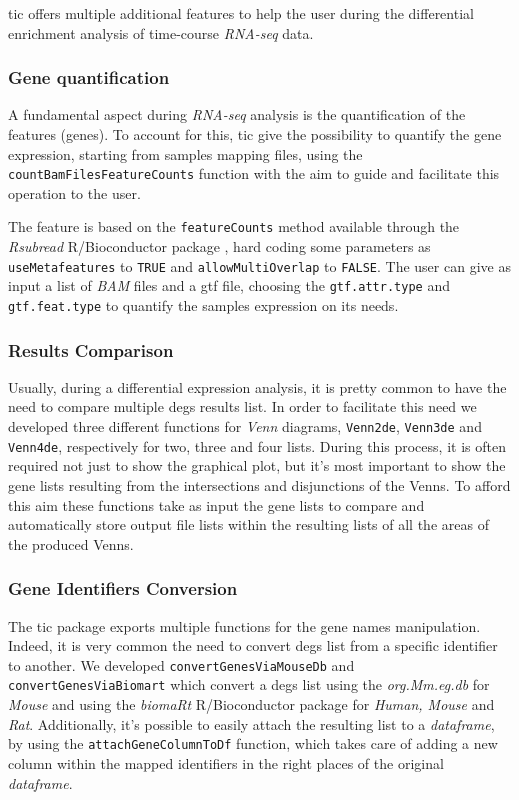 \gls{tic} offers multiple additional features to help the user during the differential enrichment analysis of time-course \textit{RNA-seq} data.

\subsubsection{Gene quantification}

A fundamental aspect during \textit{RNA-seq} analysis is the quantification of the features (genes).
To account for this, \gls{tic} give the possibility to quantify the gene expression, starting from samples mapping files, using the \lstinline!countBamFilesFeatureCounts! function with the aim to guide and facilitate this operation to the user.

The feature is based on the \lstinline!featureCounts! method available through the \textit{Rsubread} R/Bioconductor package \cite{Liao2013}, hard coding some parameters as \lstinline!useMetafeatures! to \lstinline!TRUE! and \lstinline!allowMultiOverlap! to \lstinline!FALSE!.
The user can give as input a list of \textit{BAM} files and a \gls{gtf} file, choosing  the \lstinline!gtf.attr.type! and \lstinline!gtf.feat.type! to quantify the samples expression on its needs.

\subsubsection{Results Comparison}

Usually, during a differential expression analysis, it is pretty common to have the need to compare multiple \glspl{deg} results list.
In order to facilitate this need we developed three different functions for \textit{Venn} diagrams, \lstinline!Venn2de!, \lstinline!Venn3de! and \lstinline!Venn4de!, respectively for two, three and four lists.
During this process, it is often required not just to show the graphical plot, but it's most important to show the gene lists resulting from the intersections and disjunctions of the Venns.
To afford this aim these functions take as input the gene lists to compare and automatically store output file lists within the resulting lists of all the areas of the produced Venns.

\subsubsection{Gene Identifiers Conversion}

The \gls{tic} package exports multiple functions for the gene names manipulation. 
Indeed, it is very common the need to convert \glspl{deg} list from a specific identifier to another.
We developed \lstinline!convertGenesViaMouseDb! and \lstinline!convertGenesViaBiomart! which convert a \glspl{deg} list using the \textit{org.Mm.eg.db} \cite{Carlson2018} for \textit{Mouse} and using the \textit{biomaRt} R/Bioconductor package for \textit{Human, Mouse} and \textit{Rat}.
Additionally, it's possible to easily attach the resulting list to a \textit{dataframe}, by using the \lstinline!attachGeneColumnToDf! function, which takes care of adding a new column within the mapped identifiers in the right places of the original \textit{dataframe}.

